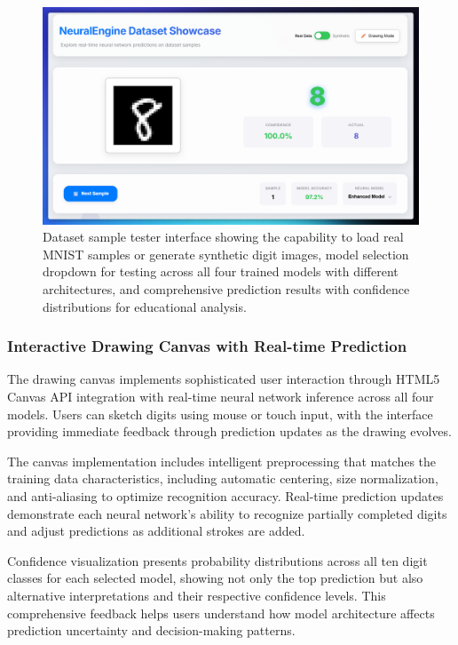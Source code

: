 \documentclass[11pt,a4paper]{report}
\begin{document}
\begin{figure}[H]
\centering
\includegraphics[width=\textwidth]{digit_recognizer_dataset_tester.png}
\caption{Dataset sample tester interface showing the capability to load real MNIST samples or generate synthetic digit images, model selection dropdown for testing across all four trained models with different architectures, and comprehensive prediction results with confidence distributions for educational analysis.}
\label{fig:digit_dataset_tester}
\end{figure}

\subsubsection{Interactive Drawing Canvas with Real-time Prediction}

The drawing canvas implements sophisticated user interaction through HTML5 Canvas API integration with real-time neural network inference across all four models. Users can sketch digits using mouse or touch input, with the interface providing immediate feedback through prediction updates as the drawing evolves.

The canvas implementation includes intelligent preprocessing that matches the training data characteristics, including automatic centering, size normalization, and anti-aliasing to optimize recognition accuracy. Real-time prediction updates demonstrate each neural network's ability to recognize partially completed digits and adjust predictions as additional strokes are added.

Confidence visualization presents probability distributions across all ten digit classes for each selected model, showing not only the top prediction but also alternative interpretations and their respective confidence levels. This comprehensive feedback helps users understand how model architecture affects prediction uncertainty and decision-making patterns.
\end{document}
